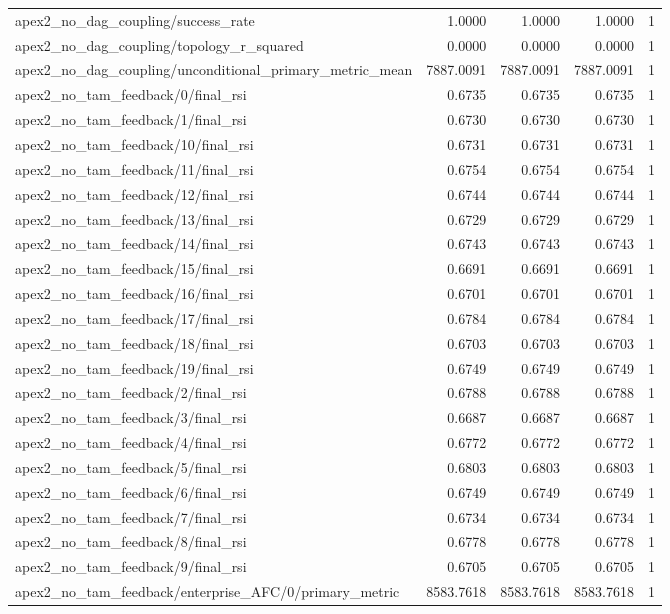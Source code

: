 \begin{table}[h]
\begin{tabular}{lrrrr}
apex2_no_dag_coupling/success_rate & 1.0000 & 1.0000 & 1.0000 & 1 \\
apex2_no_dag_coupling/topology_r_squared & 0.0000 & 0.0000 & 0.0000 & 1 \\
apex2_no_dag_coupling/unconditional_primary_metric_mean & 7887.0091 & 7887.0091 & 7887.0091 & 1 \\
apex2_no_tam_feedback/0/final_rsi & 0.6735 & 0.6735 & 0.6735 & 1 \\
apex2_no_tam_feedback/1/final_rsi & 0.6730 & 0.6730 & 0.6730 & 1 \\
apex2_no_tam_feedback/10/final_rsi & 0.6731 & 0.6731 & 0.6731 & 1 \\
apex2_no_tam_feedback/11/final_rsi & 0.6754 & 0.6754 & 0.6754 & 1 \\
apex2_no_tam_feedback/12/final_rsi & 0.6744 & 0.6744 & 0.6744 & 1 \\
apex2_no_tam_feedback/13/final_rsi & 0.6729 & 0.6729 & 0.6729 & 1 \\
apex2_no_tam_feedback/14/final_rsi & 0.6743 & 0.6743 & 0.6743 & 1 \\
apex2_no_tam_feedback/15/final_rsi & 0.6691 & 0.6691 & 0.6691 & 1 \\
apex2_no_tam_feedback/16/final_rsi & 0.6701 & 0.6701 & 0.6701 & 1 \\
apex2_no_tam_feedback/17/final_rsi & 0.6784 & 0.6784 & 0.6784 & 1 \\
apex2_no_tam_feedback/18/final_rsi & 0.6703 & 0.6703 & 0.6703 & 1 \\
apex2_no_tam_feedback/19/final_rsi & 0.6749 & 0.6749 & 0.6749 & 1 \\
apex2_no_tam_feedback/2/final_rsi & 0.6788 & 0.6788 & 0.6788 & 1 \\
apex2_no_tam_feedback/3/final_rsi & 0.6687 & 0.6687 & 0.6687 & 1 \\
apex2_no_tam_feedback/4/final_rsi & 0.6772 & 0.6772 & 0.6772 & 1 \\
apex2_no_tam_feedback/5/final_rsi & 0.6803 & 0.6803 & 0.6803 & 1 \\
apex2_no_tam_feedback/6/final_rsi & 0.6749 & 0.6749 & 0.6749 & 1 \\
apex2_no_tam_feedback/7/final_rsi & 0.6734 & 0.6734 & 0.6734 & 1 \\
apex2_no_tam_feedback/8/final_rsi & 0.6778 & 0.6778 & 0.6778 & 1 \\
apex2_no_tam_feedback/9/final_rsi & 0.6705 & 0.6705 & 0.6705 & 1 \\
apex2_no_tam_feedback/enterprise_AFC/0/primary_metric & 8583.7618 & 8583.7618 & 8583.7618 & 1 \\

\end{tabular}
\end{table}
